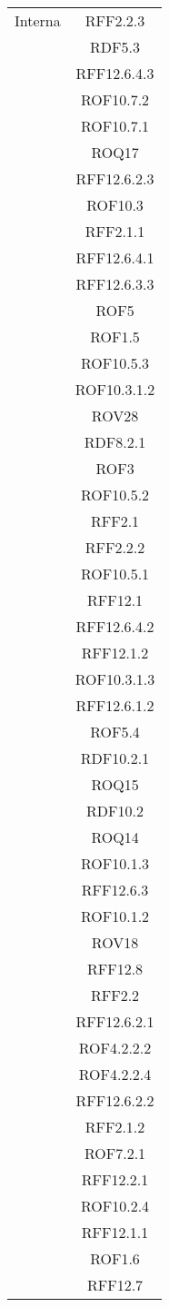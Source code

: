 \begin{longtable}{|c|c|}
\midrule
Interna
& RFF2.2.3\\
& RDF5.3\\
& RFF12.6.4.3\\
& ROF10.7.2\\
& ROF10.7.1\\
& ROQ17\\
& RFF12.6.2.3\\
& ROF10.3\\
& RFF2.1.1\\
& RFF12.6.4.1\\
& RFF12.6.3.3\\
& ROF5\\
& ROF1.5\\
& ROF10.5.3\\
& ROF10.3.1.2\\
& ROV28\\
& RDF8.2.1\\
& ROF3\\
& ROF10.5.2\\
& RFF2.1\\
& RFF2.2.2\\
& ROF10.5.1\\
& RFF12.1\\
& RFF12.6.4.2\\
& RFF12.1.2\\
& ROF10.3.1.3\\
& RFF12.6.1.2\\
& ROF5.4\\
& RDF10.2.1\\
& ROQ15\\
& RDF10.2\\
& ROQ14\\
& ROF10.1.3\\
& RFF12.6.3\\
& ROF10.1.2\\
& ROV18\\
& RFF12.8\\
& RFF2.2\\
& RFF12.6.2.1\\
& ROF4.2.2.2\\
& ROF4.2.2.4\\
& RFF12.6.2.2\\
& RFF2.1.2\\
& ROF7.2.1\\
& RFF12.2.1\\
& ROF10.2.4\\
& RFF12.1.1\\
& ROF1.6\\
& RFF12.7\\

\end{longtable}
